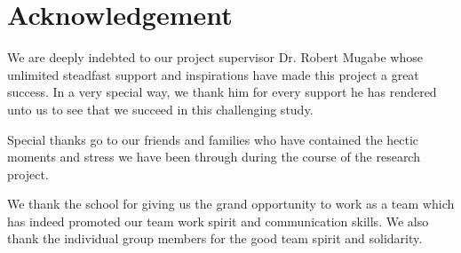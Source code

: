 \cleardoublepage
{}
\chapter*{Acknowledgement}
We are deeply indebted to our project supervisor Dr. Robert Mugabe whose unlimited steadfast support and inspirations have made this project a great success. In a very special way, we thank him for every support he has rendered unto us to see that we succeed in this challenging study.

Special thanks go to our friends and families who have contained the hectic moments and stress we have been through during the course of the research project.

We thank the school for giving us the grand opportunity to work as a team which has indeed promoted our team work spirit and communication skills. We also thank the individual group members for the good team spirit and solidarity.

\newpage
